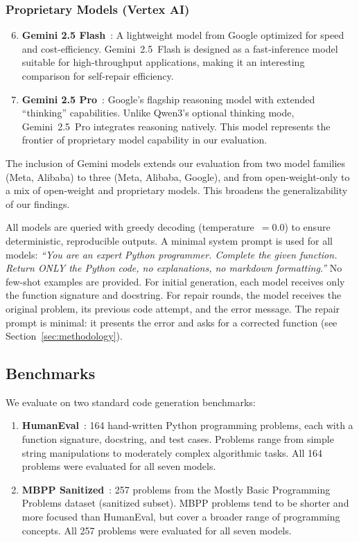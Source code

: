 \documentclass[conference]{IEEEtran}
\begin{document}
\subsubsection{Proprietary Models (Vertex AI)}

\begin{enumerate}
    \setcounter{enumi}{5}
    \item \textbf{Gemini 2.5 Flash}~\cite{gemini2025}: A lightweight model from Google optimized for speed and cost-efficiency. Gemini~2.5~Flash is designed as a fast-inference model suitable for high-throughput applications, making it an interesting comparison for self-repair efficiency.

    \item \textbf{Gemini 2.5 Pro}~\cite{gemini2025}: Google's flagship reasoning model with extended ``thinking'' capabilities. Unlike Qwen3's optional thinking mode, Gemini~2.5~Pro integrates reasoning natively. This model represents the frontier of proprietary model capability in our evaluation.
\end{enumerate}

The inclusion of Gemini models extends our evaluation from two model families (Meta, Alibaba) to three (Meta, Alibaba, Google), and from open-weight-only to a mix of open-weight and proprietary models. This broadens the generalizability of our findings.

All models are queried with greedy decoding (temperature~$=0.0$) to ensure deterministic, reproducible outputs. A minimal system prompt is used for all models: \emph{``You are an expert Python programmer. Complete the given function. Return ONLY the Python code, no explanations, no markdown formatting.''} No few-shot examples are provided. For initial generation, each model receives only the function signature and docstring. For repair rounds, the model receives the original problem, its previous code attempt, and the error message. The repair prompt is minimal: it presents the error and asks for a corrected function (see Section~\ref{sec:methodology}).

\subsection{Benchmarks}

We evaluate on two standard code generation benchmarks:

\begin{enumerate}
    \item \textbf{HumanEval}~\cite{chen2021evaluating}: 164 hand-written Python programming problems, each with a function signature, docstring, and test cases. Problems range from simple string manipulations to moderately complex algorithmic tasks. All 164 problems were evaluated for all seven models.

    \item \textbf{MBPP Sanitized}~\cite{austin2021program}: 257 problems from the Mostly Basic Programming Problems dataset (sanitized subset). MBPP problems tend to be shorter and more focused than HumanEval, but cover a broader range of programming concepts. All 257 problems were evaluated for all seven models.
\end{enumerate}
\end{document}
